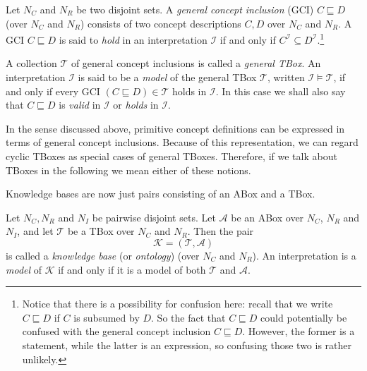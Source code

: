 \begin{Definition}
  \label{def:general-concept-inclusions-and-general-TBoxes}
  Let $N_C$ and $N_R$ be two disjoint sets.  A \emph{general concept inclusion} (GCI) $C
  \sqsubseteq D$ (over $N_C$ and $N_R$) consists of two concept descriptions $C, D$ over
  $N_C$ and $N_R$.  A GCI $C \sqsubseteq D$ is said to \emph{hold} in an interpretation
  $\mathcal{I}$ if and only if $C^{\mathcal{I}} \subseteq
  D^{\mathcal{I}}$.\footnote{Notice that there is a possibility for confusion here: recall
    that we write $C \sqsubseteq D$ if $C$ is subsumed by $D$.  So the fact that $C
    \sqsubseteq D$ could potentially be confused with the general concept inclusion $C
    \sqsubseteq D$.  However, the former is a statement, while the latter is an
    expression, so confusing those two is rather unlikely.}

  A collection $\mathcal{T}$ of general concept inclusions is called a \emph{general
    TBox}.  An interpretation $\mathcal{I}$ is said to be a \emph{model} of the general
  TBox $\mathcal{T}$, written $\mathcal{I} \models \mathcal{T}$, if and only if every GCI
  $(C \sqsubseteq D) \in \mathcal{T}$ holds in $\mathcal{I}$.  In this case we shall also
  say that $C \sqsubseteq D$ is \emph{valid} in $\mathcal{I}$ or \emph{holds} in
  $\mathcal{I}$.
\end{Definition}

In the sense discussed above, primitive concept definitions can be expressed in terms of
general concept inclusions.  Because of this representation, we can regard cyclic TBoxes
as special cases of general TBoxes.  Therefore, if we talk about TBoxes in the following
we mean either of these notions.

Knowledge bases are now just pairs consisting of an ABox and a TBox.
\begin{Definition}
  \label{def:knowledge-base}
  Let $N_C, N_R$ and $N_I$ be pairwise disjoint sets.  Let $\mathcal{A}$ be an ABox over
  $N_C$, $N_R$ and $N_I$, and let $\mathcal{T}$ be a TBox over $N_C$ and $N_R$.  Then the
  pair
  \begin{equation*}
    \mathcal{K} = (\mathcal{T}, \mathcal{A})
  \end{equation*}
  is called a \emph{knowledge base} (or \emph{ontology}) (over $N_C$ and $N_R$).  An
  interpretation is a \emph{model} of $\mathcal{K}$ if and only if it is a model of both
  $\mathcal{T}$ and $\mathcal{A}$.
\end{Definition}

